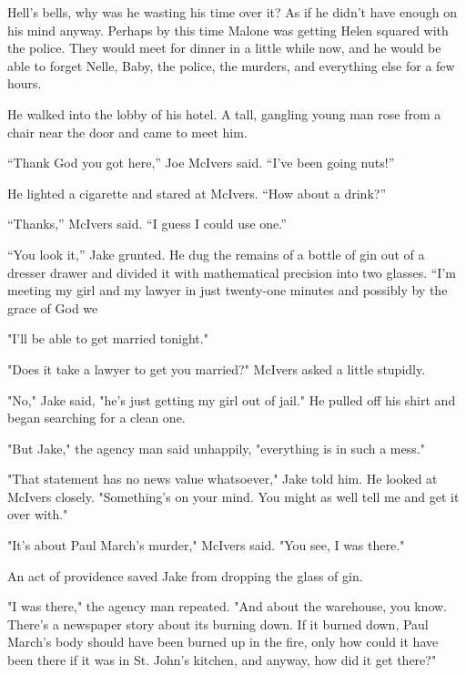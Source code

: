 \documentclass{novel}
\begin{document}
Hell’s bells, why was he wasting his time over it? As if he didn’t have enough on his mind anyway. Perhaps by this time Malone was getting Helen squared with the police. They would meet for dinner in a little while now, and he would be able to forget Nelle, Baby, the police, the murders, and everything else for a few hours.

He walked into the lobby of his hotel. A tall, gangling young man rose from a chair near the door and came to meet him.

“Thank God you got here,” Joe McIvers said. “I’ve been going nuts!”

\begin{ChapterStart}
\vspace{3\nbs}
\end{ChapterStart}

He lighted a cigarette and stared at McIvers. “How about a drink?”

“Thanks,” McIvers said. “I guess I could use one.”

“You look it,” Jake grunted. He dug the remains of a bottle of gin out of a dresser drawer and divided it with mathematical precision into two glasses. “I’m meeting my girl and my lawyer in just twenty-one minutes and possibly by the grace of God we

"I'll be able to get married tonight."

"Does it take a lawyer to get you married?" McIvers asked a little stupidly.

"No," Jake said, "he's just getting my girl out of jail." He pulled off his shirt and began searching for a clean one.

"But Jake," the agency man said unhappily, "everything is in such a mess."

"That statement has no news value whatsoever," Jake told him. He looked at McIvers closely. "Something's on your mind. You might as well tell me and get it over with."

"It's about Paul March's murder," McIvers said. "You see, I was there."

An act of providence saved Jake from dropping the glass of gin.

"I was there," the agency man repeated. "And about the warehouse, you know. There's a newspaper story about its burning down. If it burned down, Paul March's body should have been burned up in the fire, only how could it have been there if it was in St. John's kitchen, and anyway, how did it get there?"
\end{document}

